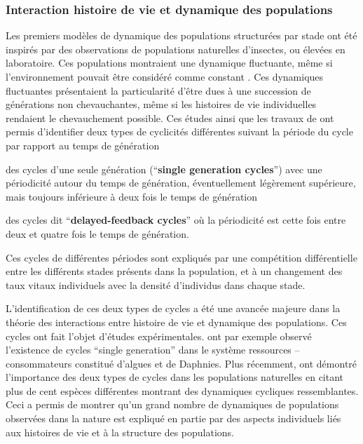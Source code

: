 \subsubsection{Interaction histoire de vie et dynamique des populations}
\label{modelPopStru}
Les premiers modèles de dynamique des populations structurées par stade
\autocites{gurney1980a,gurney1983a,nisbet1983a,lawton1981a} ont été inspirés par
des observations de populations naturelles d'insectes, ou élevées en
laboratoire.
Ces populations montraient une dynamique fluctuante, même si l'environnement
pouvait être considéré comme constant
\autocites{nicholson1954a,gurney1983a,ebenman1988a,godfray1989a}. Ces dynamiques
fluctuantes présentaient la particularité d'être dues à une succession de
générations non chevauchantes, même si les histoires de vie individuelles
rendaient le chevauchement possible. Ces études ainsi que les travaux de
\textcite{gurney1985a} ont permis d'identifier deux types de cyclicités
différentes suivant la période du cycle par rapport au temps de génération
\begin{enumerate*}[label=(\roman*), before=\unskip{ : }, itemjoin={{ ; }},
itemjoin*={{ ; et }}]
  \item des cycles d'une seule génération (``\textbf{single generation
  cycles}'') avec une périodicité autour du temps de génération, éventuellement légèrement
  supérieure, mais toujours inférieure à deux fois le temps de génération \item
  des cycles dit ``\textbf{delayed-feedback cycles}'' où la périodicité est
  cette fois entre deux et quatre fois le temps de génération.
\end{enumerate*} 
Ces cycles de différentes périodes sont expliqués par une compétition
différentielle entre les différents stades présents dans la population, et à un
changement des taux vitaux individuels avec la densité d'individus dans chaque
stade.

L'identification de ces deux types de cycles a été une avancée majeure dans la
théorie des interactions entre histoire de vie et dynamique des populations. 
Ces cycles ont fait l'objet d'études expérimentales.
\textcite{mccauley1987a} ont par exemple observé l'existence de cycles ``single
generation'' dans le système ressources -- consommateurs constitué d'algues et
de Daphnies. Plus récemment, \textcite{murdoch2002a} ont démontré l'importance des
deux types de cycles dans les populations naturelles en citant plus de cent
espèces différentes montrant des dynamiques cycliques ressemblantes. Ceci a
permis de montrer qu'un grand nombre de dynamiques de populations observées dans
la nature est expliqué en partie par des aspects individuels liés aux
histoires de vie et à la structure des populations.

